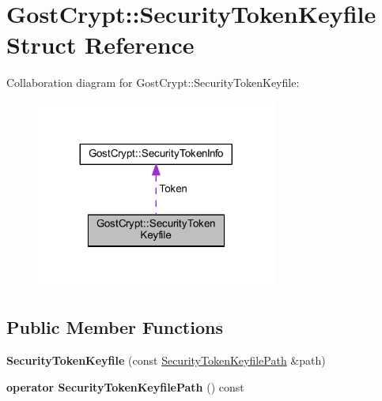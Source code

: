 \hypertarget{struct_gost_crypt_1_1_security_token_keyfile}{}\section{Gost\+Crypt\+:\+:Security\+Token\+Keyfile Struct Reference}
\label{struct_gost_crypt_1_1_security_token_keyfile}


Collaboration diagram for Gost\+Crypt\+:\+:Security\+Token\+Keyfile\+:
\nopagebreak
\begin{figure}[H]
\begin{center}
\leavevmode
\includegraphics[width=224pt]{struct_gost_crypt_1_1_security_token_keyfile__coll__graph}
\end{center}
\end{figure}
\subsection*{Public Member Functions}
\begin{DoxyCompactItemize}
\item 
\mbox{\label{struct_gost_crypt_1_1_security_token_keyfile_ac2ae17e728f526d7854e00f4f4caddf6}} 
{\bfseries Security\+Token\+Keyfile} (const \hyperlink{struct_gost_crypt_1_1_security_token_keyfile_path}{Security\+Token\+Keyfile\+Path} \&path)
\item 
\mbox{\label{struct_gost_crypt_1_1_security_token_keyfile_a78cb3f70e9b294f67e6ca86eb4931029}} 
{\bfseries operator Security\+Token\+Keyfile\+Path} () const
\end{DoxyCompactItemize}
